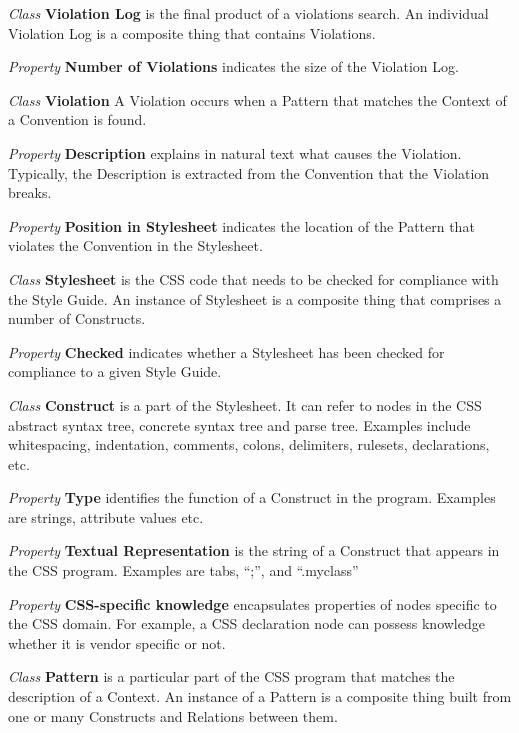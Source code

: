 \documentclass[parskip=full]{uvamscse}
\begin{document}
\begin{description}
\item\textit{Class} \textbf{Violation Log} is the final product of a violations search. An individual Violation Log is a composite thing that contains Violations.

\textit{Property} \textbf{Number of Violations} indicates the size of the Violation Log. 


\item\textit{Class} \textbf{Violation} A Violation occurs when a Pattern that matches the Context of a Convention is found.

\textit{Property} \textbf{Description} explains in natural text what causes the Violation. Typically, the Description is extracted from the Convention that the Violation breaks.

\textit{Property} \textbf{Position in Stylesheet} indicates the location of the Pattern that violates the Convention in the Stylesheet. 


\item\textit{Class} \textbf{Stylesheet} is the CSS code that needs to be checked for compliance with the Style Guide. An instance of Stylesheet is a composite thing that comprises a number of Constructs.

\textit{Property} \textbf{Checked} indicates whether a Stylesheet has been checked for compliance to a given Style Guide. 


\item\textit{Class} \textbf{Construct} is a part of the Stylesheet. It can refer to nodes in the CSS abstract syntax tree, concrete syntax tree and parse tree. Examples include whitespacing, indentation, comments, colons, delimiters, rulesets, declarations, etc.

\textit{Property} \textbf{Type} identifies the function of a Construct in the program. Examples are strings, attribute values etc.

\textit{Property} \textbf{Textual Representation} is the string of a Construct that appears in the CSS program. Examples are tabs, ``;'', and ``.myclass''

\textit{Property} \textbf{CSS-specific knowledge} encapsulates properties of nodes specific to the CSS domain. For example, a CSS declaration node can possess knowledge whether it is vendor specific or not.


\item\textit{Class} \textbf{Pattern} is a particular part of the CSS program that matches the description of a Context. An instance of a Pattern is a composite thing built from one or many Constructs and Relations between them.


\end{description}
\end{document}
